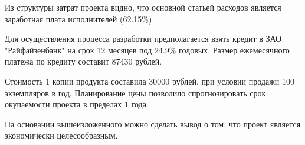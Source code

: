 Из структуры затрат проекта видно, что основной статьей расходов является заработная плата исполнителей (62.15\%).

Для осуществления процесса разработки предполагается взять кредит в ЗАО "Райфайзенбанк" на срок 12 месяцев под 24.9\% годовых. Размер ежемесячного платежа по кредиту  составит 87430 рублей.

Стоимость 1 копии продукта составила 30000 рублей, при условии продажи 100 экземпляров в год. Планирование цены позволило спрогнозировать срок окупаемости проекта в пределах 1 года.

На основании вышеизложенного можно сделать вывод о том, что проект является экономически целесообразным.
